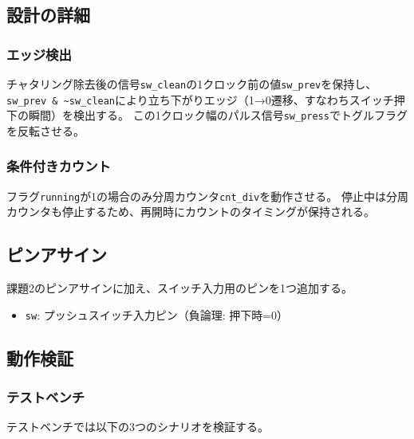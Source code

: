 \documentclass[a4paper,11pt]{ltjsarticle}
\begin{document}


\subsection{設計の詳細}

\subsubsection{エッジ検出}

チャタリング除去後の信号\texttt{sw\_clean}の1クロック前の値\texttt{sw\_prev}を保持し、
\texttt{sw\_prev \& \~{}sw\_clean}により立ち下がりエッジ（1→0遷移、すなわちスイッチ押下の瞬間）を検出する。
この1クロック幅のパルス信号\texttt{sw\_press}でトグルフラグを反転させる。

\subsubsection{条件付きカウント}

フラグ\texttt{running}が1の場合のみ分周カウンタ\texttt{cnt\_div}を動作させる。
停止中は分周カウンタも停止するため、再開時にカウントのタイミングが保持される。

\subsection{ピンアサイン}

課題2のピンアサインに加え、スイッチ入力用のピンを1つ追加する。

\begin{itemize}
\item \texttt{sw}: プッシュスイッチ入力ピン（負論理: 押下時=0）
\end{itemize}

\subsection{動作検証}

\subsubsection{テストベンチ}



テストベンチでは以下の3つのシナリオを検証する。
\end{document}
